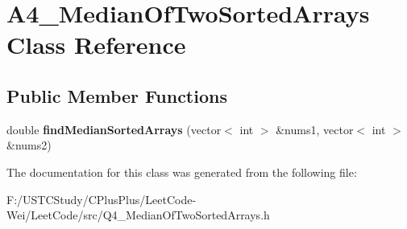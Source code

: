\hypertarget{class_a4___median_of_two_sorted_arrays}{}\section{A4\+\_\+\+Median\+Of\+Two\+Sorted\+Arrays Class Reference}
\label{class_a4___median_of_two_sorted_arrays}
\subsection*{Public Member Functions}
\begin{DoxyCompactItemize}
\item 
\hypertarget{class_a4___median_of_two_sorted_arrays_ab093a00fda335f08798cf798d3f17099}{}\label{class_a4___median_of_two_sorted_arrays_ab093a00fda335f08798cf798d3f17099} 
double {\bfseries find\+Median\+Sorted\+Arrays} (vector$<$ int $>$ \&nums1, vector$<$ int $>$ \&nums2)
\end{DoxyCompactItemize}


The documentation for this class was generated from the following file\+:\begin{DoxyCompactItemize}
\item 
F\+:/\+U\+S\+T\+C\+Study/\+C\+Plus\+Plus/\+Leet\+Code-\/\+Wei/\+Leet\+Code/src/Q4\+\_\+\+Median\+Of\+Two\+Sorted\+Arrays.\+h\end{DoxyCompactItemize}
